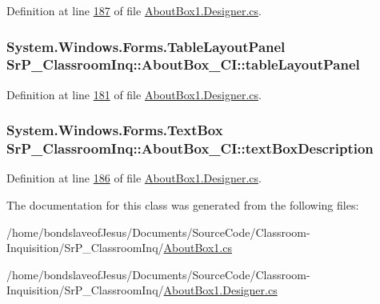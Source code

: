 \-Definition at line \hyperlink{_about_box1_8_designer_8cs_source_l00187}{187} of file \hyperlink{_about_box1_8_designer_8cs_source}{\-About\-Box1.\-Designer.\-cs}.

\hypertarget{class_sr_p___classroom_inq_1_1_about_box___c_i_ad10dbcf552f02d9075d3512e37346602}{
\subsubsection[{table\-Layout\-Panel}]{\setlength{\rightskip}{0pt plus 5cm}\-System.\-Windows.\-Forms.\-Table\-Layout\-Panel {\bf \-Sr\-P\-\_\-\-Classroom\-Inq\-::\-About\-Box\-\_\-\-C\-I\-::table\-Layout\-Panel}}}
\label{class_sr_p___classroom_inq_1_1_about_box___c_i_ad10dbcf552f02d9075d3512e37346602}


\-Definition at line \hyperlink{_about_box1_8_designer_8cs_source_l00181}{181} of file \hyperlink{_about_box1_8_designer_8cs_source}{\-About\-Box1.\-Designer.\-cs}.

\hypertarget{class_sr_p___classroom_inq_1_1_about_box___c_i_a3dbeb289a884177d325e5d3145c29427}{
\subsubsection[{text\-Box\-Description}]{\setlength{\rightskip}{0pt plus 5cm}\-System.\-Windows.\-Forms.\-Text\-Box {\bf \-Sr\-P\-\_\-\-Classroom\-Inq\-::\-About\-Box\-\_\-\-C\-I\-::text\-Box\-Description}}}
\label{class_sr_p___classroom_inq_1_1_about_box___c_i_a3dbeb289a884177d325e5d3145c29427}


\-Definition at line \hyperlink{_about_box1_8_designer_8cs_source_l00186}{186} of file \hyperlink{_about_box1_8_designer_8cs_source}{\-About\-Box1.\-Designer.\-cs}.



\-The documentation for this class was generated from the following files\-:\begin{DoxyCompactItemize}
\item 
/home/bondslaveof\-Jesus/\-Documents/\-Source\-Code/\-Classroom-\/\-Inquisition/\-Sr\-P\-\_\-\-Classroom\-Inq/\hyperlink{_about_box1_8cs}{\-About\-Box1.\-cs}\item 
/home/bondslaveof\-Jesus/\-Documents/\-Source\-Code/\-Classroom-\/\-Inquisition/\-Sr\-P\-\_\-\-Classroom\-Inq/\hyperlink{_about_box1_8_designer_8cs}{\-About\-Box1.\-Designer.\-cs}\end{DoxyCompactItemize}
